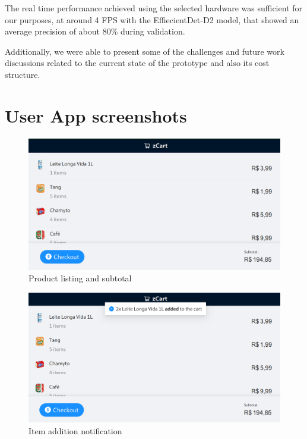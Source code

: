 \documentclass[openright]{normas-utf-tex} %
\begin{document}
The real time performance achieved using the selected hardware was sufficient
for our purposes, at around 4 FPS with the EffiecientDet-D2 model, that showed an
average precision of about 80\% during validation.

Additionally, we were able to present some of the challenges and future work
discussions related to the current state of the prototype and also its cost
structure.


\clearpage
\label{bibstart}

\label{bibend}

\apendice
\chapter{User App screenshots}
\label{ap:userapp}

\begin{figure}[H]
	\centering
	\includegraphics[width=1\textwidth]{./images/userapp.png}
	\caption[]{Product listing and subtotal}
\end{figure}

\begin{figure}[H]
	\centering
	\includegraphics[width=1\textwidth]{./images/userapp2.png}
	\caption[]{Item addition notification}
\end{figure}
\end{document}
